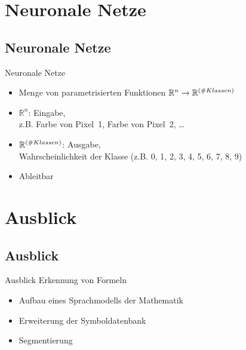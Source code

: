 \section{Neuronale Netze}
\subsection{Neuronale Netze}
\begin{frame}{Neuronale Netze}{}
    \begin{itemize}[<+->]
        \item Menge von parametrisierten Funktionen
              $\mathbb{R}^n \rightarrow \mathbb{R}^{\text(\# Klassen)}$
        \item $\mathbb{R}^n$: Eingabe,\\z.B. Farbe von Pixel~1, Farbe von Pixel~2, \dots
        \item $\mathbb{R}^{\text(\# Klassen)}$: Ausgabe,\\Wahrscheinlichkeit der Klasse (z.B. 0, 1, 2, 3, 4, 5, 6, 7, 8, 9)
        \item Ableitbar
    \end{itemize}
\end{frame}

\section{Ausblick}
\subsection{Ausblick}
\begin{frame}{Ausblick}
    Erkennung von Formeln
    \begin{itemize}[<+->]
        \item Aufbau eines Sprachmodells der Mathematik
        \item Erweiterung der Symboldatenbank
        \item Segmentierung
    \end{itemize}
\end{frame}

